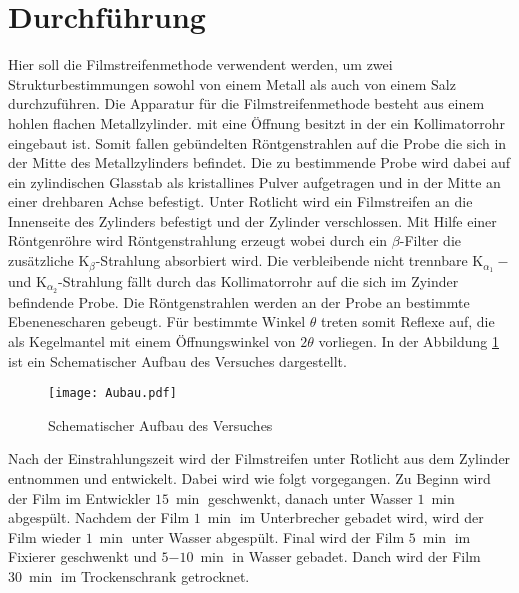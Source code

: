 \section{Durchführung}
\label{sec:Durchführung}
Hier soll die Filmstreifenmethode verwendent werden,
um zwei Strukturbestimmungen
sowohl von einem Metall als auch von
einem Salz durchzuführen.
Die Apparatur für die Filmstreifenmethode besteht aus einem hohlen flachen Metallzylinder.
mit eine Öffnung besitzt in der ein Kollimatorrohr eingebaut ist.
Somit fallen gebündelten Röntgenstrahlen auf die Probe die sich in
der Mitte des Metallzylinders befindet.
Die zu bestimmende Probe wird dabei auf ein zylindischen Glasstab
als kristallines Pulver aufgetragen und in der Mitte an einer drehbaren
Achse befestigt. Unter Rotlicht wird ein Filmstreifen an die Innenseite
des Zylinders befestigt und der Zylinder verschlossen.
Mit Hilfe einer Röntgenröhre wird Röntgenstrahlung erzeugt
wobei durch ein $\beta$-Filter die zusätzliche
$\mathrm{K}_\beta$-Strahlung absorbiert wird.
Die verbleibende nicht trennbare  $\mathrm{K}_{\alpha_1}-$
und $\mathrm{K}_{\alpha_2}$-Strahlung fällt durch das Kollimatorrohr
auf die sich im Zyinder befindende Probe. Die Röntgenstrahlen werden an
der Probe an bestimmte Ebenenescharen gebeugt. Für bestimmte Winkel $\theta$ treten
somit Reflexe auf, die als Kegelmantel mit einem Öffnungswinkel von $2\theta$
vorliegen. In der Abbildung \ref{fig:aufbau} ist ein Schematischer Aufbau des Versuches dargestellt.
\begin{figure}
  \centering
  \texttt{[image: Aubau.pdf]}
  \caption{Schematischer Aufbau des Versuches  }
  \label{fig:aufbau}
 \end{figure}
Nach der Einstrahlungszeit wird der Filmstreifen unter Rotlicht
aus dem Zylinder entnommen und entwickelt.
Dabei wird wie folgt vorgegangen.
Zu Beginn wird der Film im Entwickler $\SI{15}{\min}$ geschwenkt,
danach unter Wasser $\SI{1}{\min}$ abgespült.
Nachdem der Film $\SI{1}{\min}$ im Unterbrecher gebadet wird, wird
der Film wieder $\SI{1}{\min}$ unter Wasser abgespült.
Final wird der Film $\SI{5}{\min}$ im Fixierer geschwenkt und
$\SI{5-10}{\min}$ in Wasser gebadet.
Danch wird der Film $\SI{30}{\min}$ im Trockenschrank getrocknet.


